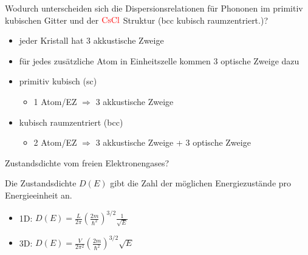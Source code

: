 \documentclass[a5paper,12pt,ngerman,grid=front %
,print
]{kartei}
\let\oldce\ce
\renewcommand*{\ce}[1]{\begingroup\color{red}\oldce{#1}\endgroup}
\begin{document}
	\begin{karte}{
		Wodurch unterscheiden sich die Dispersionsrelationen für Phononen im primitiv 
		kubischen Gitter und der $\ce{CsCl}$ Struktur (bcc kubisch raumzentriert.)?
		}
		
		\begin{itemize}
			\item jeder Kristall hat 3 akkustische Zweige
			\item für jedes zusätzliche Atom in Einheitszelle kommen 3 optische Zweige dazu
			\item primitiv kubisch (sc)
				\begin{itemize}
					\item 1 Atom/EZ $\Rightarrow$ 3 akkustische Zweige
				\end{itemize}
			\item kubisch raumzentriert (bcc)
				\begin{itemize}
					\item 2 Atom/EZ $\Rightarrow$ 3 akkustische Zweige + 3 optische Zweige
				\end{itemize}
		\end{itemize}
		
	\end{karte}


	\begin{karte}{
		Zustandsdichte vom freien Elektronengases?
		}
		
		Die Zustandsdichte $D(E)$ gibt die Zahl der möglichen Energiezustände pro Energieeinheit an. \\

		\begin{itemize}
			\item 1D:  $  D(E) = \frac{L}{2\pi} \left( \frac{2m}{\hbar^2} \right)^{3/2} \frac{1}{\sqrt{E}}   $
			\item 3D:  $  D(E) = \frac{V}{2\pi^2} \left( \frac{2m}{\hbar^2} \right)^{3/2} \sqrt{E}   $
		\end{itemize}
		
		
	\end{karte}
\end{document}
